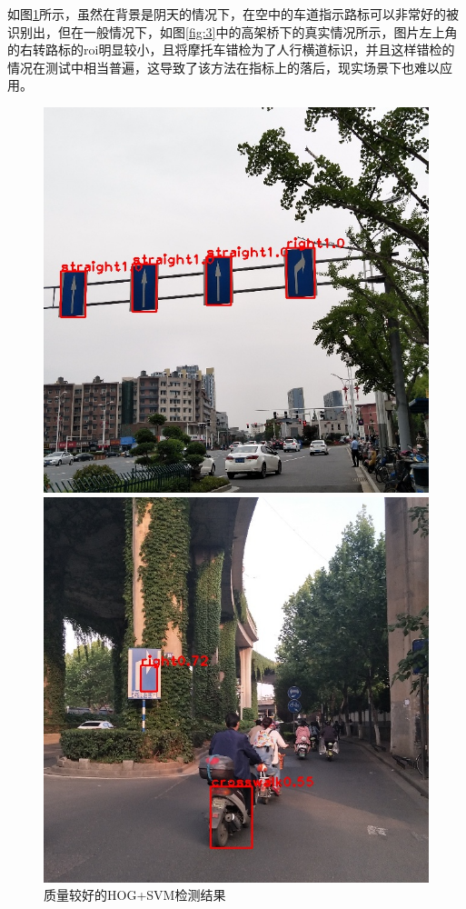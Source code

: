 \documentclass{article}
\begin{document}
如图\ref{fig:2}所示，虽然在背景是阴天的情况下，在空中的车道指示路标可以非常好的被识别出，但在一般情况下，如图\ref{fig:3}中的高架桥下的真实情况所示，图片左上角的右转路标的roi明显较小，且将摩托车错检为了人行横道标识，并且这样错检的情况在测试中相当普遍，这导致了该方法在指标上的落后，现实场景下也难以应用。
\begin{figure}[H]
    \centering
    \begin{minipage}[t]{0.49\linewidth}
        \centering
        \includegraphics[width=1\linewidth, trim=0 50 0 50, clip]{test_results/sign_433_result.jpg}
        \caption{质量较好的HOG+SVM检测结果}
        \label{fig:2}
    \end{minipage}
    \begin{minipage}[t]{0.49\linewidth}
        \centering
        \includegraphics[width=1\linewidth, trim=50 30 50 160, clip]{test_results/sign_120_result.jpg}

\end{minipage}
\end{figure}
\end{document}
